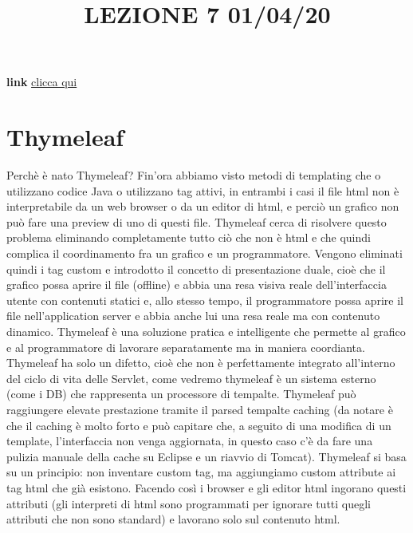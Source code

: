 \title{LEZIONE 7 01/04/20}\newline
\textbf{link} \href{https://web.microsoftstream.com/video/4801f2c5-d151-42aa-9a42-f7400b41b4e7}{clicca qui}
\section{Thymeleaf}
Perchè è nato Thymeleaf? Fin'ora abbiamo visto metodi di templating che o utilizzano codice Java o utilizzano tag attivi, in entrambi i casi il file html non è interpretabile da un web browser o da un editor di html, e perciò un grafico non può fare una preview di uno di questi file. Thymeleaf cerca di risolvere questo problema eliminando completamente tutto ciò che non è html e che quindi complica il coordinamento fra un grafico e un programmatore.\newline
Vengono eliminati quindi i tag custom e introdotto il concetto di presentazione duale, cioè che il grafico possa aprire il file (offline) e abbia una resa visiva reale dell'interfaccia utente con contenuti statici e, allo stesso tempo, il programmatore possa aprire il file nell'application server e abbia anche lui una resa reale ma con contenuto dinamico.\newline
\newline
Thymeleaf è una soluzione pratica e intelligente che permette al grafico e al programmatore di lavorare separatamente ma in maniera coordianta.\newline
\newline
Thymeleaf ha solo un difetto, cioè che non è perfettamente integrato all'interno del ciclo di vita delle Servlet, come vedremo thymeleaf è un sistema esterno (come i DB) che rappresenta un processore di tempalte.\newline
\newline
Thymeleaf può raggiungere elevate prestazione tramite il parsed tempalte caching (da notare è che il caching è molto forto e può capitare che, a seguito di una modifica di un template, l'interfaccia non venga aggiornata, in questo caso c'è da fare una pulizia manuale della cache su Eclipse e un riavvio di Tomcat).\newline
\newline
Thymeleaf si basa su un principio: non inventare custom tag, ma aggiungiamo custom attribute ai tag html che già esistono. Facendo così i browser e gli editor html ingorano questi attributi (gli interpreti di html sono programmati per ignorare tutti quegli attributi che non sono standard) e lavorano solo sul contenuto html.\newline
